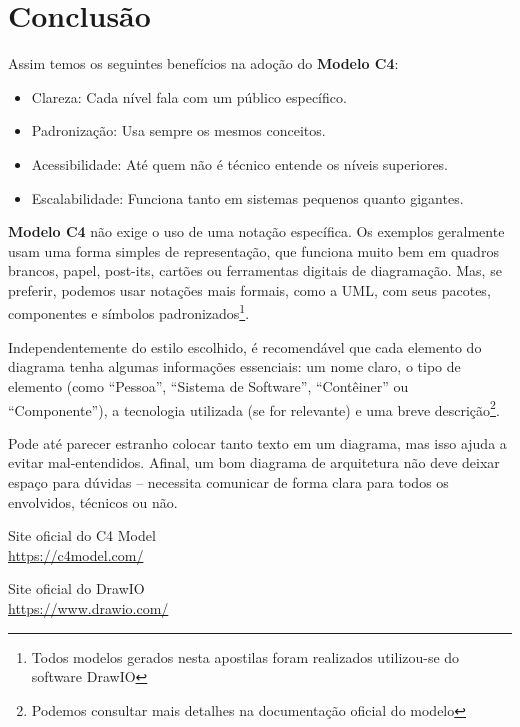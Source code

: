 \documentclass[a4paper,11pt]{article}
\begin{document}
\section{Conclusão}
Assim temos os seguintes benefícios na adoção do \textbf{Modelo C4}:
\begin{itemize}
	\item Clareza: Cada nível fala com um público específico.
	\item Padronização: Usa sempre os mesmos conceitos.
	\item Acessibilidade: Até quem não é técnico entende os níveis superiores.
	\item Escalabilidade: Funciona tanto em sistemas pequenos quanto gigantes.
\end{itemize}

\textbf{Modelo C4} não exige o uso de uma notação específica. Os exemplos geralmente usam uma forma simples de representação, que funciona muito bem em quadros brancos, papel, post-its, cartões ou ferramentas digitais de diagramação. Mas, se preferir, podemos usar notações mais formais, como a UML, com seus pacotes, componentes e símbolos padronizados\footnote{Todos modelos gerados nesta apostilas foram realizados utilizou-se do software DrawIO\cite{drawio}}.

Independentemente do estilo escolhido, é recomendável que cada elemento do diagrama tenha
algumas informações essenciais: um nome claro, o tipo de elemento (como “Pessoa”, “Sistema de
Software”, “Contêiner” ou “Componente”), a tecnologia utilizada (se for relevante) e uma breve
descrição\footnote{Podemos consultar mais detalhes na documentação oficial do modelo\cite{c4}}.

Pode até parecer estranho colocar tanto texto em um diagrama, mas isso ajuda a evitar mal-entendidos. Afinal, um bom diagrama de arquitetura não deve deixar espaço para dúvidas -- necessita comunicar de forma clara para todos os envolvidos, técnicos ou não.



\begin{thebibliography}{7}
  Site oficial do C4 Model \\
  \url{https://c4model.com/}

  Site oficial do DrawIO \\
  \url{https://www.drawio.com/}
  
  
\end{thebibliography}
\end{document}
